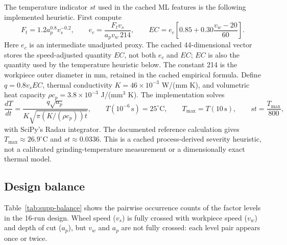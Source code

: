 The temperature indicator $st$ used in the cached ML features is the
following implemented heuristic. First compute
\begin{equation}
\label{eq:ec-implemented}
F_t=1.2a_p^{0.8}v_s^{-0.2},\qquad
e_c=\frac{F_t v_s}{a_p v_w\,214},\qquad
EC=e_c\left[0.85+0.30\frac{v_w-20}{60}\right].
\end{equation}
Here \(e_c\) is an intermediate unadjusted proxy. The cached
44-dimensional vector stores the speed-adjusted quantity \(EC\), not both
\(e_c\) and \(EC\); \(EC\) is also the quantity used by the temperature
heuristic below. The constant 214 is the workpiece outer diameter in mm, retained in the
cached empirical formula. Define $q=0.8v_s EC$, thermal conductivity
$K=46\times10^{-3}$ W/(mm K), and volumetric heat capacity
$\rho c_p=3.8\times10^{-3}$ J/(mm$^3$ K). The implementation solves
\begin{equation}
\label{eq:st-implemented}
\frac{dT}{dt}=\frac{q\sqrt{a_p}}{K\sqrt{\pi(K/(\rho c_p))t}},\qquad
T(10^{-6}\,\mathrm{s})=25^\circ\mathrm{C},\qquad
T_{\max}=T(10\,\mathrm{s}),\qquad st=\frac{T_{\max}}{800},
\end{equation}
with SciPy's Radau integrator. The documented reference calculation gives
\(T_{\max}\approx26.9^\circ\mathrm{C}\) and \(st\approx0.0336\).
This is a cached process-derived severity heuristic, not a calibrated
grinding-temperature measurement or a dimensionally exact thermal model.

\subsection*{Design balance}

Table~\ref{tab:supp-balance} shows the pairwise occurrence counts of the
factor levels in the 16-run design. Wheel speed ($v_s$) is fully crossed
with workpiece speed ($v_w$) and depth of cut ($a_p$), but $v_w$ and
$a_p$ are not fully crossed: each level pair appears once or twice.


